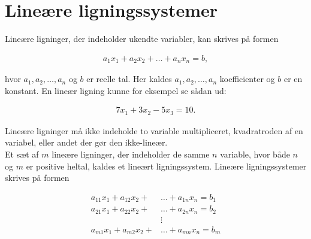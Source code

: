 \section{Lineære ligningssystemer}
Lineære ligninger, der indeholder ukendte variabler, kan skrives på formen

\begin{align*}
a_1x_1+a_2x_2+ \dots +a_nx_n = b,
\end{align*}

hvor $a_1, a_2, \dots , a_n$ og $b$ er reelle tal. 
Her kaldes $a_1,a_2, \dots , a_n$ koefficienter og $b$ er en konstant. En lineær ligning kunne for eksempel se sådan ud:

\begin{align*}
7x_1+3x_2-5x_3 = 10.
\end{align*}

Lineære ligninger må ikke indeholde to variable multipliceret, kvadratroden af en variabel, eller andet der gør den ikke-lineær. \\
Et sæt af $m$ lineære ligninger, der indeholder de samme $n$ variable, hvor både $n$ og $m$ er positive heltal, kaldes et lineært ligningssystem. Lineære ligningssystemer skrives på formen

\begin{align*}
a_{11}x_1+a_{12}x_2+ &\dots +a_{1n}x_n = b_1\\
a_{21}x_1+a_{22}x_2+ &\dots +a_{2n}x_n = b_2\\
&\vdots \\
a_{m1}x_1+a_{m2}x_2+ &\dots +a_{mn}x_n = b_m
\end{align*}

